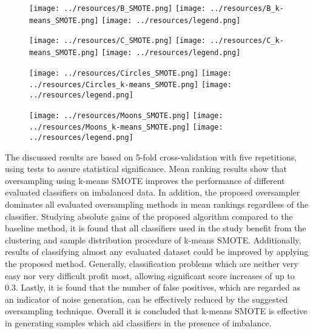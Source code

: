 \documentclass[sort&compress]{elsarticle}
\begin{document}
 \begin{figure}[ht]
	\centering
	\texttt{[image: ../resources/B\_SMOTE.png]}
	\hfill
	\texttt{[image: ../resources/B\_k-means\_SMOTE.png]}
	\texttt{[image: ../resources/legend.png]}
	\label{fig:toy-b}
 \end{figure}

 \begin{figure}[ht]
	\centering
	\texttt{[image: ../resources/C\_SMOTE.png]}
	\hfill
	\texttt{[image: ../resources/C\_k-means\_SMOTE.png]}
	\texttt{[image: ../resources/legend.png]}
	\label{fig:toy-c}
 \end{figure}

  \begin{figure}[ht]
	\centering
	\texttt{[image: ../resources/Circles\_SMOTE.png]}
	\hfill
	\texttt{[image: ../resources/Circles\_k-means\_SMOTE.png]}
	\texttt{[image: ../resources/legend.png]}
	\label{fig:toy-circles}
 \end{figure}

 \begin{figure}[ht]
	\centering
	\texttt{[image: ../resources/Moons\_SMOTE.png]}
	\hfill
	\texttt{[image: ../resources/Moons\_k-means\_SMOTE.png]}
	\texttt{[image: ../resources/legend.png]}
	\label{fig:toy-moons}
 \end{figure}

The discussed results are based on 5-fold cross-validation with five repetitions, using tests to assure statistical significance. Mean ranking results show that oversampling using k-means \ac{SMOTE} improves the performance of different evaluated classifiers on imbalanced data. In addition, the proposed oversampler dominates all evaluated oversampling methods in mean rankings regardless of the classifier. Studying absolute gains of the proposed algorithm compared to the baseline method, it is found that all classifiers used in the study benefit from the clustering and sample distribution procedure of k-means \ac{SMOTE}. Additionally, results of classifying almost any evaluated dataset could be improved by applying the proposed method. Generally, classification problems which are neither very easy nor very difficult profit most, allowing significant score increases of up to 0.3. Lastly, it is found that the number of false positives, which are regarded as an indicator of noise generation, can be effectively reduced by the suggested oversampling technique. Overall it is concluded that k-means \ac{SMOTE} is effective in generating samples which aid classifiers in the presence of imbalance.
\end{document}
